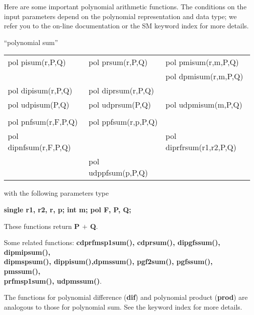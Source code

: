 Here are some important polynomial arithmetic functions. The conditions on
the input par\-ameters depend on the polynomial representation and data type;
we refer you to the on-line documentation or the SM keyword index for more 
details.

\leer
\begin{center} ``polynomial sum'' \end{center}
\begin{center}
{\bf
\begin{tabular}{lll}
pol pisum(r,P,Q)   & pol prsum(r,P,Q)   & pol pmisum(r,m,P,Q)\\
                     &                      & pol dpmisum(r,m,P,Q)\\
pol dipisum(r,P,Q) & pol diprsum(r,P,Q) &\\
pol udpisum(P,Q)    & pol udprsum(P,Q)    & pol udpmisum(m,P,Q)\\
&&\\
pol pnfsum(r,F,P,Q)   & pol ppfsum(r,p,P,Q) &\\
pol dipnfsum(r,F,P,Q) &                 & pol diprfrsum(r1,r2,P,Q)\\
                       & pol udppfsum(p,P,Q)  &\\
\end{tabular} }
\end{center}
\parbox[t]{2.5in}{with the following parameters type}
\parbox[t]{3.0in}{
\bf single r1, r2, r, p;\newline
    int m;\newline
    pol F, P, Q;}

These functions return {\bf P $+$ Q}.

Some related functions:\hspace*{0.7em}
{\bf  cdprfmsp1sum(), cdprsum(), dipgfssum(), dipmipsum(), \\
dipmspsum(), dippisum(),dpmssum(), pgf2sum(), pgfssum(), pmssum(), \\
prfmsp1sum(), udpmssum()}.

The functions for polynomial difference ({\bf *dif}) and polynomial product
({\bf *prod}) are analogous to those for polynomial sum. See the keyword
index for more details.

\newpage

